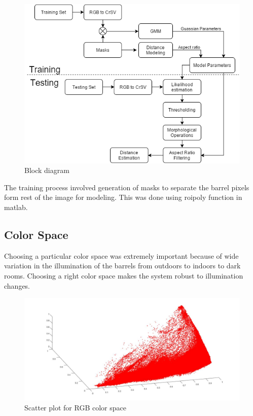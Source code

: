 \documentclass[fleqn,10pt]{SelfArx} %
\begin{document}
\begin{figure}[hbtp]
\centering
\includegraphics[scale=0.45]{block.png}
\caption{Block diagram}
\label{fig:block}
\end{figure}

The training process involved generation of masks to separate the barrel pixels form rest of the image for modeling. This was done using roipoly function in matlab.

\subsection{Color Space}
Choosing a particular color space was extremely important because of wide variation in the illumination of the barrels from outdoors to indoors to dark rooms. Choosing a right color space makes the system robust to illumination changes. 

\begin{figure}[hbtp]
\centering
\includegraphics[scale=0.15]{RGB.jpg}
\caption{Scatter plot for RGB color space}
\label{fig:rgb}
\end{figure}
\end{document}
